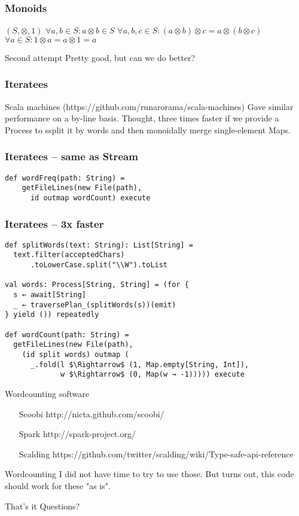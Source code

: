 \documentclass{beamer}
\begin{document}
\begin{frame}[fragile]
\frametitle{Monoids}
$(S, \otimes, 1)$\newline
$\forall a, b \in S: a \otimes b \in S$\newline
$\forall a, b, c \in S: (a \otimes b) \otimes c = a \otimes (b \otimes c)$\newline
$\forall a \in S: 1 \otimes a = a \otimes 1 = a$\newline
\end{frame}

\begin{frame}{Second attempt}
  Pretty good, but can we do better?
\end{frame}

\begin{frame}[fragile]
\frametitle{Iteratees}
Scala machines (https://github.com/runarorama/scala-machines)
Gave similar performance on a by-line basis.
Thought, three times faster if we provide a Process to ssplit it by
words and then monoidally merge single-element Maps.
\end{frame}

\begin{frame}[fragile]
\frametitle{Iteratees -- same as Stream}
\begin{lstlisting}[mathescape]
  def wordFreq(path: String) =
    getFileLines(new File(path),
      id outmap wordCount) execute
\end{lstlisting}
\end{frame}

\begin{frame}[fragile]
\frametitle{Iteratees -- 3x faster}
\begin{lstlisting}[mathescape]
def splitWords(text: String): List[String] =
  text.filter(acceptedChars)
      .toLowerCase.split("\\W").toList

val words: Process[String, String] = (for {
  s ← await[String]
  _ ← traversePlan_(splitWords(s))(emit)
} yield ()) repeatedly

def wordCount(path: String) =
  getFileLines(new File(path),
    (id split words) outmap (
      _.fold(l $\Rightarrow$ (1, Map.empty[String, Int]),
             w $\Rightarrow$ (0, Map(w → -1))))) execute
\end{lstlisting}
\end{frame}

\begin{frame}{Wordcounting software}
\begin{enumerate}
  \item[Scoobi] http://nicta.github.com/scoobi/
  \item[Spark] http://spark-project.org/
  \item[Scalding] https://github.com/twitter/scalding/wiki/Type-safe-api-reference
\end{enumerate}
\end{frame}

\begin{frame}{Wordcounting}
  I did not have time to try to use those.
  But turns out, this code should work for these "as is".
\end{frame}

\begin{frame}{That's it}
  Questions?
\end{frame}
\end{document}
